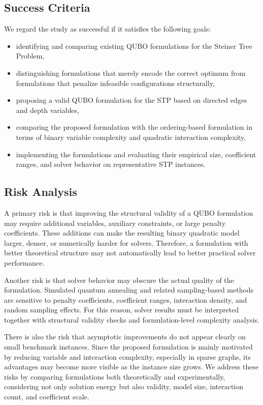 \documentclass[a4paper,12pt]{report}
\begin{document}
\subsection{Success Criteria}

We regard the study as successful if it satisfies the following goals:
\begin{itemize}
    \item identifying and comparing existing QUBO formulations for the Steiner Tree Problem,
    \item distinguishing formulations that merely encode the correct optimum from formulations that penalize infeasible configurations structurally,
    \item proposing a valid QUBO formulation for the STP based on directed edges and depth variables,
    \item comparing the proposed formulation with the ordering-based formulation in terms of binary variable complexity and quadratic interaction complexity,
    \item implementing the formulations and evaluating their empirical size, coefficient ranges, and solver behavior on representative STP instances.
\end{itemize}

\subsection{Risk Analysis}

A primary risk is that improving the structural validity of a QUBO formulation may require additional variables, auxiliary constraints, or large penalty coefficients. These additions can make the resulting binary quadratic model larger, denser, or numerically harder for solvers. Therefore, a formulation with better theoretical structure may not automatically lead to better practical solver performance.

Another risk is that solver behavior may obscure the actual quality of the formulation. Simulated quantum annealing and related sampling-based methods are sensitive to penalty coefficients, coefficient ranges, interaction density, and random sampling effects. For this reason, solver results must be interpreted together with structural validity checks and formulation-level complexity analysis.

There is also the risk that asymptotic improvements do not appear clearly on small benchmark instances. Since the proposed formulation is mainly motivated by reducing variable and interaction complexity, especially in sparse graphs, its advantages may become more visible as the instance size grows. We address these risks by comparing formulations both theoretically and experimentally, considering not only solution energy but also validity, model size, interaction count, and coefficient scale.
\end{document}
